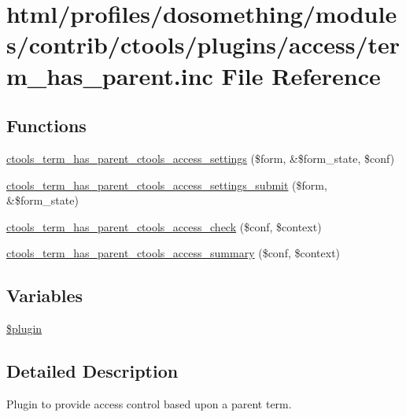 \hypertarget{term__has__parent_8inc}{
\section{html/profiles/dosomething/modules/contrib/ctools/plugins/access/term\_\-has\_\-parent.inc File Reference}
\label{term__has__parent_8inc}
}
\subsection*{Functions}
\begin{DoxyCompactItemize}
\item 
\hyperlink{term__has__parent_8inc_a97fd82cee1ee0e75e36dc648f152fcc1}{ctools\_\-term\_\-has\_\-parent\_\-ctools\_\-access\_\-settings} (\$form, \&\$form\_\-state, \$conf)
\item 
\hyperlink{term__has__parent_8inc_a764b12f323c0759a9eb277a33b287c57}{ctools\_\-term\_\-has\_\-parent\_\-ctools\_\-access\_\-settings\_\-submit} (\$form, \&\$form\_\-state)
\item 
\hyperlink{term__has__parent_8inc_a26c4c783d65d99cc160862cb38c7537a}{ctools\_\-term\_\-has\_\-parent\_\-ctools\_\-access\_\-check} (\$conf, \$context)
\item 
\hyperlink{term__has__parent_8inc_a398c547268a6a2cb4562f27a6f369ebd}{ctools\_\-term\_\-has\_\-parent\_\-ctools\_\-access\_\-summary} (\$conf, \$context)
\end{DoxyCompactItemize}
\subsection*{Variables}
\begin{DoxyCompactItemize}
\item 
\hyperlink{term__has__parent_8inc_ada8a7130088351710bb02ed622d6bf65}{\$plugin}
\end{DoxyCompactItemize}


\subsection{Detailed Description}
Plugin to provide access control based upon a parent term. 

